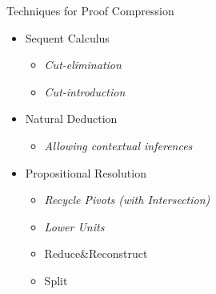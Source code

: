 \documentclass[9pt]{beamer}
\begin{document}
\begin{frame}{Techniques for Proof Compression}
\begin{itemize}
\item Sequent Calculus
	\begin{itemize}
	\item \emph{Cut-elimination}
	\item \emph{Cut-introduction}
	\end{itemize}
\item Natural Deduction
	\begin{itemize}
	\item \alert{\emph{Allowing \emph{contextual} inferences}}
	\end{itemize}
\item Propositional Resolution
	\begin{itemize}
	\item \alert{\emph{Recycle Pivots (with Intersection)}}
	\item \alert{\emph{Lower Units}}
	\item \alert{Reduce\&Reconstruct}
	\item \alert{Split}
	\end{itemize}
\end{itemize}
\end{frame}
\end{document}
